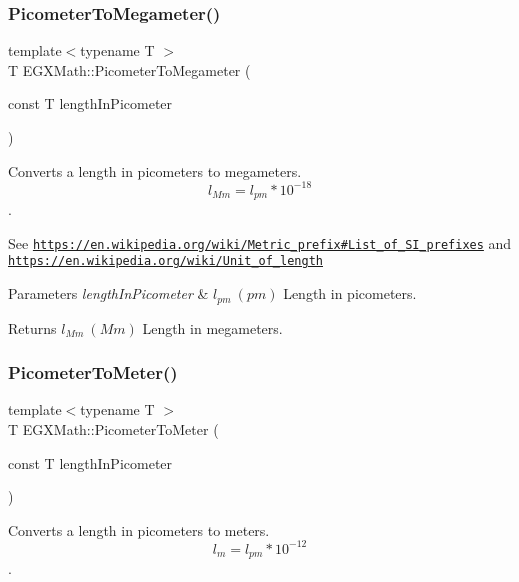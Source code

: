 \subsubsection{\texorpdfstring{Picometer\+To\+Megameter()}{PicometerToMegameter()}}
{\footnotesize\ttfamily template$<$typename T $>$ \\
T E\+G\+X\+Math\+::\+Picometer\+To\+Megameter (\begin{DoxyParamCaption}\item[{const T}]{length\+In\+Picometer }\end{DoxyParamCaption})}



Converts a length in picometers to megameters. \[ l_{Mm}=l_{pm} * 10^{-18} \]. 

See \href{https://en.wikipedia.org/wiki/Metric_prefix#List_of_SI_prefixes}{\tt https\+://en.\+wikipedia.\+org/wiki/\+Metric\+\_\+prefix\#\+List\+\_\+of\+\_\+\+S\+I\+\_\+prefixes} and \href{https://en.wikipedia.org/wiki/Unit_of_length}{\tt https\+://en.\+wikipedia.\+org/wiki/\+Unit\+\_\+of\+\_\+length} 
\begin{DoxyParams}{Parameters}
{\em length\+In\+Picometer} & $ l_{pm}\ (pm)$ Length in picometers. \\
\hline
\end{DoxyParams}
\begin{DoxyReturn}{Returns}
$ l_{Mm}\ (Mm)$ Length in megameters. 
\end{DoxyReturn}
\mbox{\label{group___e_g_x_math-_conversions-_length_conversions-_picometer-_s_i_gab975f2eb902fcbb745ee4edbbf611f69}} 
\subsubsection{\texorpdfstring{Picometer\+To\+Meter()}{PicometerToMeter()}}
{\footnotesize\ttfamily template$<$typename T $>$ \\
T E\+G\+X\+Math\+::\+Picometer\+To\+Meter (\begin{DoxyParamCaption}\item[{const T}]{length\+In\+Picometer }\end{DoxyParamCaption})}



Converts a length in picometers to meters. \[ l_{m}=l_{pm} * 10^{-12} \]. 


